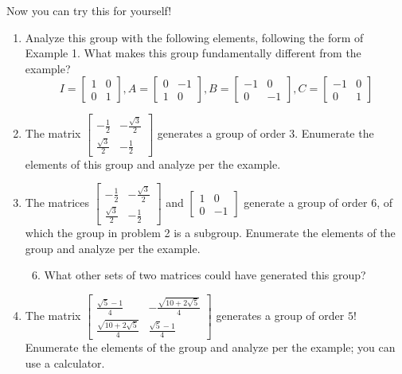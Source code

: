 \documentclass[../gatm.tex]{subfiles}
\begin{document}
Now you can try this for yourself!
\begin{enumerate}
\item Analyze this group with the following elements, following the form of Example 1. What makes this group fundamentally different from the example?
$$I=\left[\begin{array}{cc} 1 & 0 \\ 0 & 1 \end{array}\right], A=\left[\begin{array}{cc} 0 & -1 \\ 1 & 0 \end{array}\right], B=\left[\begin{array}{cc} -1 & 0 \\ 0 & -1 \end{array}\right], C=\left[\begin{array}{cc} -1 & 0 \\ 0 & 1 \end{array}\right]$$
\item The matrix $\left[\begin{array}{cc} -\frac{1}{2} & -\frac{\sqrt{3}}{2} \\ \frac{\sqrt{3}}{2} & -\frac{1}{2}\end{array}\right]$ generates a group of order $3$. Enumerate the elements of this group and analyze per the example.
\item The matrices $\left[\begin{array}{cc} -\frac{1}{2} & -\frac{\sqrt{3}}{2} \\ \frac{\sqrt{3}}{2} & -\frac{1}{2}\end{array}\right]$ and $\left[\begin{array}{cc} 1 & 0 \\ 0 & -1 \end{array}\right]$ generate a group of order $6$, of which the group in problem 2 is a subgroup. Enumerate the elements of the group and analyze per the example.
\begin{enumerate}
\setcounter{enumii}{5}
\item What other sets of two matrices could have generated this group?
\end{enumerate}
\item The matrix $\left[\begin{array}{cc} \frac{\sqrt{5}-1}{4} & -\frac{\sqrt{10+2\sqrt{5}}}{4} \\ \frac{\sqrt{10+2\sqrt{5}}}{4} & \frac{\sqrt{5}-1}{4} \end{array}\right]$ generates a group of order $5$! Enumerate the elements of the group and analyze per the example; you can use a calculator.

\end{enumerate}
\end{document}

